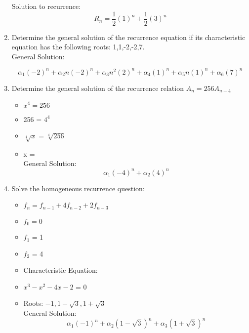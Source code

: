 \documentclass[11pt]{article}
\newcounter{prnum}
\newenvironment{problem}{{\vskip 0.2in\noindent\bf Problem
       \addtocounter{prnum}{1} \arabic{prnum}.}}{\vskip 0.1in}
\begin{document}
\begin{problem}
\begin{enumerate}[label=\alph*)]
      Solution to recurrence: 
      \begin{equation}
        R_n = \frac{1}{2} (1)^n + \frac{1}{2} (3)^n
      \end{equation}

    \item Determine the general solution of the recurrence equation if its characteristic
      equation has the following roots: 1,1,-2,-2,7.\\


        General Solution: 

      \begin{equation}
        \alpha_1(-2)^n+\alpha_2n(-2)^n+\alpha_3n^2(2)^n+\alpha_4(1)^n+\alpha_5n(1)^n+\alpha_6(7)^n
      \end{equation}

    \item Determine the general solution of the recurrence relation $A_n = 256A_{n-4}$
      \begin{itemize}
        \item $x^4 = 256$
        \item 256 = $4^4$
        \item \Rightarrow $\sqrt[4]{x} = \sqrt[4]{256}$
        \item x = \\
         General Solution: 
         \begin{equation}
         \alpha_1(-4)^n+\alpha_2(4)^n
         \end{equation}
      \end{itemize}

      \pagebreak
    \item Solve the homogeneous recurrence question:
      \begin{itemize}
      \item $f_n = f_{n-1} + 4 f_{n-2} + 2 f_{n-3}$
        \item $f_0 = 0$
        \item $f_1$ = 1
        \item $f_2$ = 4
        \item Characteristic Equation: 
        \item \Rightarrow $x^3 - x^2 - 4x - 2$ = 0 
        \item \Rightarrow Roots: $-1, 1 - \sqrt{3}, 1 + \sqrt{3}$\\

        General Solution:
          \begin{equation}
        \alpha_{1} (-1)^{n} + \alpha_{2} (1-\sqrt{3})^{n} + \alpha_{3} (1 + \sqrt{3})^n
          \end{equation}
      \end{itemize}
  \end{enumerate}
\end{problem} 
\end{document}
